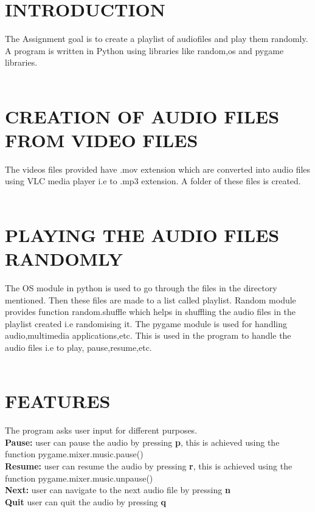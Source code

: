 \documentclass[journal,12pt,twocolumn]{IEEEtran}
\begin{document}
\maketitle
\bigskip
\section{INTRODUCTION} 	The Assignment goal is to create a playlist of audiofiles and play them randomly. A program is written in Python using libraries like random,os and pygame libraries.
\\
\\
\section{CREATION OF AUDIO FILES FROM VIDEO FILES} The videos files provided have .mov extension which are converted into audio files using VLC media player i.e to .mp3 extension. A folder of these files is created.
\\
\\
\section{PLAYING THE AUDIO FILES RANDOMLY} The OS module in python is used to go through the files in the directory mentioned. Then these files are made to a list called playlist. Random module provides function random.shuffle which helps in shuffling the audio files in the playlist created i.e randomising it.
The pygame module is used for handling audio,multimedia applications,etc. This is used in the program to handle the audio files i.e to play, pause,resume,etc.
\\
\\
\section{FEATURES} The program asks user input for different purposes. \\
\textbf{Pause:} user can pause the audio by pressing \textbf{p}, this is achieved using the function pygame.mixer.music.pause()\\
\textbf{Resume:} user can resume the audio by pressing \textbf{r}, this is achieved using the function pygame.mixer.music.unpause()\\
\textbf{Next:} user can navigate to the next audio file by pressing \textbf{n}\\
\textbf{Quit } user can quit the audio by pressing \textbf{q}
\\
\\
\end{document}
